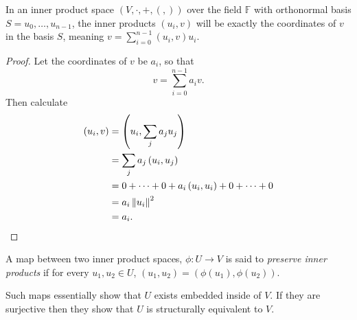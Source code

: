 \begin{prop}\label{coords-inner-product}
	In an inner product space $(V, \cdot, +, (,))$ over the field $\mathbb{F}$ with orthonormal basis $S={u_0, \dots, u_{n-1}}$, the inner products $(u_i, v)$ will be exactly the coordinates of $v$ in the basis $S$, meaning $v = \sum_{i=0}^{n-1} (u_i,v)u_i$.
\end{prop}
\begin{proof}
	Let the coordinates of $v$ be $a_i$, so that
	\[v = \sum_{i=0}^{n-1}a_iv.\]
	Then calculate
	\begin{align*}
		(u_i, v)
		&= \left(u_i, \sum_j a_ju_j\right)
		\\&= \sum_j a_j\left(u_i, u_j\right)
		\\&= 0 + \dots + 0 + a_i\left(u_i, u_i\right) + 0 + \dots + 0
		\\&= a_i\left\Vert u_i \right\Vert^2
		\\&= a_i.
	\end{align*}
\end{proof}

\begin{define}
	A map between two inner product spaces, $\phi: U \to V$ is said to \emph{preserve inner products} if for every $u_1, u_2 \in U$, $(u_1, u_2) = (\phi(u_1), \phi(u_2))$.
\end{define}

Such maps essentially show that $U$ exists embedded inside of $V$. If they are surjective then they show that $U$ is structurally equivalent to $V$.

